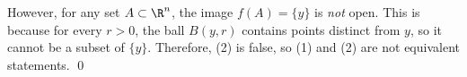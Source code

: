 \documentclass[letterpaper]{article}
\begin{document}
\begin{enumerate}
\begin{example*}
However, for any set $A \subset \R^n$, the image $f(A)=\{y\}$ is \emph{not} open. This is because for every $r>0$, the ball $B(y,r)$ contains points distinct from $y$, so it cannot be a subset of $\{y\}$. Therefore, (2) is false, so (1) and (2) are not equivalent statements. \qed
\end{example*}
\end{enumerate}
\end{document}
